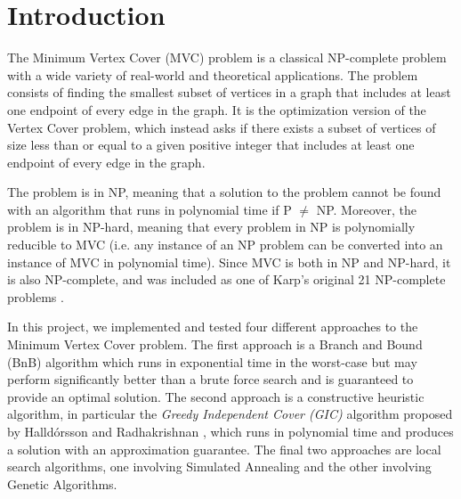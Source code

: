 \documentclass[acmlarge]{acmart}
\begin{document}



\maketitle

\section{Introduction}


The Minimum Vertex Cover (MVC) problem is a classical NP-complete problem with a wide variety of real-world and theoretical applications. The problem consists of finding the smallest subset of vertices in a graph that includes at least one endpoint of every edge in the graph. It is the optimization version of the Vertex Cover problem, which instead asks if there exists a subset of vertices of size less than or equal to a given positive integer that includes at least one endpoint of every edge in the graph.

The problem is in NP, meaning that a solution to the problem cannot be found with an algorithm that runs in polynomial time if P $\neq$ NP. Moreover, the problem is in NP-hard, meaning that every problem in NP is polynomially reducible to MVC (i.e. any instance of an NP problem can be converted into an instance of MVC in polynomial time). Since MVC is both in NP and NP-hard, it is also NP-complete, and was included as one of Karp's original 21 NP-complete problems \cite{karp1972reducibility}.

In this project, we implemented and tested four different approaches to the Minimum Vertex Cover problem. The first approach is a Branch and Bound (BnB) algorithm which runs in exponential time in the worst-case but may perform significantly better than a brute force search and is guaranteed to provide an optimal solution. The second approach is a constructive heuristic algorithm, in particular the \textit{Greedy Independent Cover (GIC)} algorithm proposed by Halld\'{o}rsson and Radhakrishnan \cite{Hall97}, which runs in polynomial time and produces a solution with an approximation guarantee. The final two approaches are local search algorithms, one involving Simulated Annealing and the other involving Genetic Algorithms.
\end{document}
